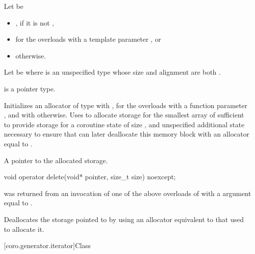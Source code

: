 \begin{itemdescr}
\pnum
Let  be
\begin{itemize}
\item
{}, if it is not ,
\item
{} for the overloads with a template parameter , or
\item
{} otherwise.
\end{itemize}
Let  be 
where  is an unspecified type whose size and alignment
are both .

\pnum
\mandates
{} is a pointer type.

\pnum
\effects
Initializes an allocator  of type  with ,
for the overloads with a function parameter ,
and with  otherwise.
Uses  to allocate storage for the smallest array
of  sufficient to provide storage for
a coroutine state of size , and
unspecified additional state necessary to ensure that
 can later deallocate this memory block
with an allocator equal to .

\pnum
\returns
A pointer to the allocated storage.
\end{itemdescr}

%
\begin{itemdecl}
void operator delete(void* pointer, size_t size) noexcept;
\end{itemdecl}

\begin{itemdescr}
\pnum
\expects
{} was returned from an invocation of
one of the above overloads of 
with a  argument equal to .

\pnum
\effects
Deallocates the storage pointed to by 
using an allocator equivalent to that used to allocate it.
\end{itemdescr}

[coro.generator.iterator]{Class }

